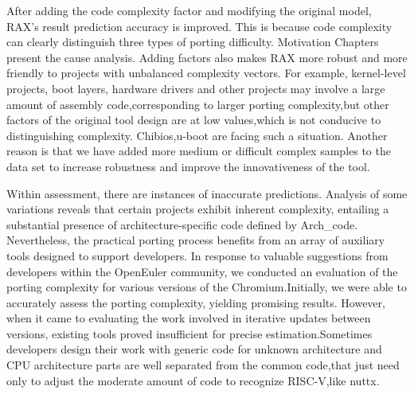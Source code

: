 \documentclass[sigconf,screen,review,anonymous]{acmart}
\begin{document}
After adding the code complexity factor and modifying the original model, RAX's result prediction accuracy is improved.
This is because code complexity can clearly distinguish three types of porting difficulty.
Motivation Chapters present the cause analysis.
Adding factors also makes RAX more robust and more friendly to projects with unbalanced complexity vectors.
For example, kernel-level projects, boot layers, hardware drivers and other projects may involve a large amount of assembly code,corresponding to larger porting complexity,but other factors of the original tool design are at low values,which is not conducive to distinguishing complexity.
Chibios,u-boot are facing such a situation. Another reason is that we have added more medium or difficult complex samples to the data set to increase robustness and improve the innovativeness of the tool.     




Within assessment, there are instances of inaccurate predictions. Analysis of some variations reveals that certain projects exhibit inherent complexity, entailing a substantial presence of architecture-specific code defined by Arch\_code.
Nevertheless, the practical porting process benefits from an array of auxiliary tools designed to support developers. In response to valuable suggestions from developers within the OpenEuler community, we conducted an evaluation of the porting complexity for various versions of the Chromium.Initially, we were able to accurately assess the porting complexity, yielding promising results. However, when it came to evaluating the work involved in iterative updates between versions, existing tools proved insufficient for precise estimation.Sometimes developers design their work with generic code for unknown architecture and CPU architecture parts are well separated from the common code,that just need only to adjust the moderate amount of code to recognize RISC-V,like nuttx.
\end{document}
